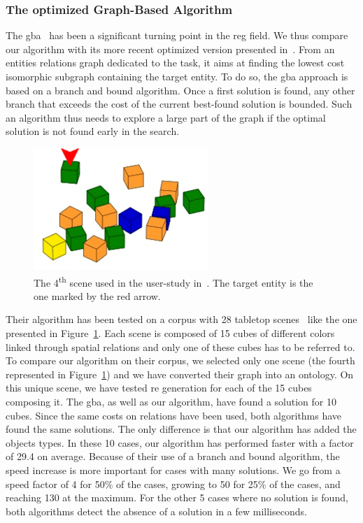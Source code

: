 \subsubsection{The optimized Graph-Based Algorithm}

The \acrshort{gba}~\cite{viethen_2013_graphs} has been a significant turning point in the \acrshort{reg} field. We thus compare our algorithm with its more recent optimized version presented in~\cite{li_2017_automatically}. From an entities relations graph dedicated to the task, it aims at finding the lowest cost isomorphic subgraph containing the target entity. To do so, the \acrshort{gba} approach is based on a branch and bound algorithm. Once a first solution is found, any other branch that exceeds the cost of the current best-found solution is bounded. Such an algorithm thus needs to explore a large part of the graph if the optimal solution is not found early in the search.

\newpage

\begin{figure}[ht!]
\centering
\includegraphics[scale=0.7]{figures/chapter4/GBA.png}
\caption{\label{fig:chap4_gba} The 4\textsuperscript{th} scene used in the user-study in~\cite{li_2016_spatial}. The target entity is the one marked by the red arrow.}
\end{figure}

Their algorithm has been tested on a corpus with 28 tabletop scenes~\cite{li_2016_spatial} like the one presented in Figure~\ref{fig:chap4_gba}. Each scene is composed of 15 cubes of different colors linked through spatial relations and only one of these cubes has to be referred to. To compare our algorithm on their corpus, we selected only one scene (the fourth represented in Figure~\ref{fig:chap4_gba}) and we have converted their graph into an ontology. On this unique scene, we have tested \acrshort{re} generation for each of the 15 cubes composing it. The \acrshort{gba}, as well as our algorithm, have found a solution for 10 cubes. Since the same costs on relations have been used, both algorithms have found the same solutions. The only difference is that our algorithm has added the objects types. In these 10 cases, our algorithm has performed faster with a factor of 29.4 on average. Because of their use of a branch and bound algorithm, the speed increase is more important for cases with many solutions. We go from a speed factor of 4 for 50\% of the cases, growing to 50 for 25\% of the cases, and reaching 130 at the maximum. For the other 5 cases where no solution is found, both algorithms detect the absence of a solution in a few milliseconds.


